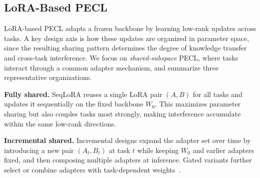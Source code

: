 \documentclass{article}
\theoremstyle{plain}
\theoremstyle{definition}
\theoremstyle{remark}
\begin{document}
 














\subsection{LoRA-Based PECL}
\label{sec:pecl-setup}

LoRA-based PECL adapts a frozen backbone by learning low-rank updates across tasks. A key design axis is how these updates are organized in parameter space, since the resulting sharing pattern determines the degree of knowledge transfer and cross-task interference. We focus on \emph{shared-subspace} PECL, where tasks interact through a common adapter mechanism, and summarize three representative organizations.

\textbf{Fully shared.}
SeqLoRA reuses a single LoRA pair $(A,B)$ for all tasks and updates it sequentially on the fixed backbone $W_0$. This maximizes parameter sharing but also couples tasks most strongly, making interference accumulate within the same low-rank directions.

\textbf{Incremental shared.}
Incremental designs expand the adapter set over time by introducing a new pair $(A_t,B_t)$ at task $t$ while keeping $W_0$ and earlier adapters fixed, and then composing multiple adapters at inference. Gated variants further select or combine adapters with task-dependent weights~\citep{Gao_2023_ICCV,10.1145/3730436.3730456,zhao-etal-2024-sapt,cheng2025exploiting,wu2025sdlorascalabledecoupledlowrank}.
\end{document}

